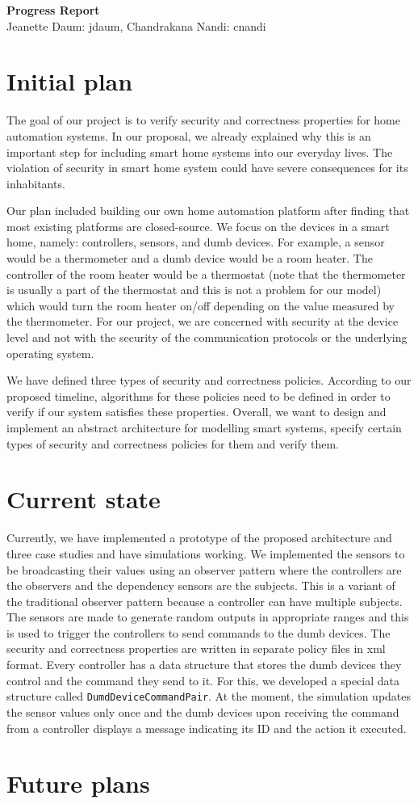 \documentclass{article}
\begin{document}
\begin{center}
\large \textbf{Progress Report}\\
\normalsize {Jeanette Daum: jdaum, Chandrakana Nandi: cnandi}
\end{center}
\section{Initial plan}
The goal of our project is to verify security and correctness properties for home automation systems. In our proposal, we already explained why this is an important step for including smart home systems into our everyday lives. The violation of security in smart home system could have severe consequences for its inhabitants. 

Our plan included building our own home automation platform after finding that most existing platforms are closed-source. We focus on the devices in a smart home, namely: controllers, sensors, and dumb devices. For example, a sensor would be a thermometer and a dumb device would be a room heater. The controller of the room heater would be a thermostat (note that the thermometer is usually a part of the thermostat and this is not a problem for our model) which would turn the room heater on/off depending on the value measured by the thermometer. For our project, we are concerned with security at the device level and not with the security of the communication protocols or the underlying operating system. 

We have defined three types of security and correctness policies. According to our proposed timeline, algorithms for these policies need to be defined in order to verify if our system satisfies these properties. Overall, we want to design and implement an abstract architecture for modelling smart systems, specify certain types of security and correctness policies for them and verify them. 

\section{Current state}
Currently, we have implemented a prototype of the proposed architecture and three case studies and have simulations working. We implemented the sensors to be broadcasting their values using an observer pattern where the controllers are the observers and the dependency sensors are the subjects. This is a variant of the traditional observer pattern because a controller can have multiple subjects. The sensors are made to generate random outputs in appropriate ranges and this is used to trigger the controllers to send commands to the dumb devices. The security and correctness properties are written in separate policy files in xml format. Every controller has a data structure that stores the dumb devices they control and the command they send to it. For this, we developed a special data structure called \texttt{DumdDeviceCommandPair}. At the moment, the simulation updates the sensor values only once and the dumb devices upon receiving the command from a controller displays a message indicating its ID and the action it executed.  
\section{Future plans}
\end{document}
